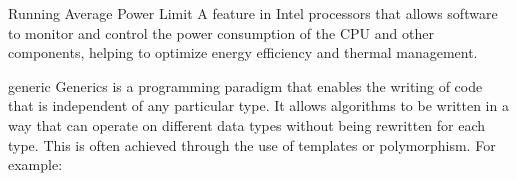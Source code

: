 {Running Average Power Limit}
{A feature in Intel processors that allows software to monitor and control the power consumption of the CPU and other components, helping to optimize energy efficiency and thermal management.}


{generic}
{Generics is a programming paradigm that enables the writing of code that is independent of any particular type. It allows algorithms to be written in a way that can operate on different data types without being rewritten for each type. This is often achieved through the use of templates or polymorphism. For example: }
